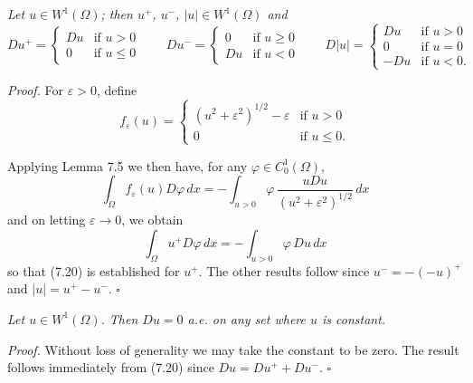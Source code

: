 \begin{lemma}\label{gt:lem-sobolev-positive-negative-parts}
\emph{Let $u\in W^{1}(\Omega)$; then $u^+$, $u^-$, $|u|\in W^{1}(\Omega)$ and}
\begin{equation}
\tag{7.20}
Du^+=
\begin{cases}
Du & \text{if } u>0 \\
0 & \text{if } u\le 0
\end{cases}
\qquad
Du^-=
\begin{cases}
0 & \text{if } u\ge 0 \\
Du & \text{if } u<0
\end{cases}
\qquad
D|u|=
\begin{cases}
Du & \text{if } u>0 \\
0 & \text{if } u=0 \\
-Du & \text{if } u<0.
\end{cases}
\end{equation}

\emph{Proof.} For $\varepsilon>0$, define
\[
f_\varepsilon(u)=
\begin{cases}
(u^2+\varepsilon^2)^{1/2}-\varepsilon & \text{if } u>0 \\
0 & \text{if } u\le 0.
\end{cases}
\]

Applying Lemma 7.5 we then have, for any $\varphi\in C_0^1(\Omega)$,
\[
\int_\Omega f_\varepsilon(u)D\varphi\,dx
=-\int_{u>0}\varphi\,\frac{uDu}{(u^2+\varepsilon^2)^{1/2}}\,dx
\]
and on letting $\varepsilon\to 0$, we obtain
\[
\int_\Omega u^+D\varphi\,dx
=-\int_{u>0}\varphi\,Du\,dx
\]
so that (7.20) is established for $u^+$. The other results follow since $u^-=-(-u)^+$
and $|u|=u^+-u^-$. $\square$

\end{lemma}

\begin{lemma}\label{gt:lem-sobolev-constant-gradient-zero}
\emph{Let $u\in W^{1}(\Omega)$. Then $Du=0$ a.e. on any set where $u$ is constant.}
\end{lemma}

\emph{Proof.} Without loss of generality we may take the constant to be zero. The result
follows immediately from (7.20) since $Du=Du^++Du^-$. $\square$


